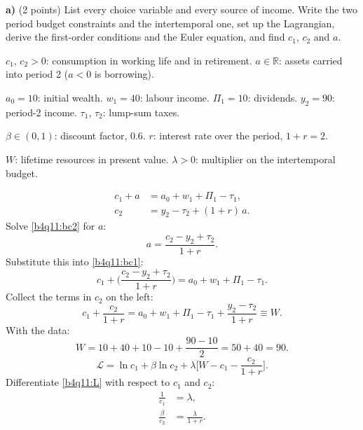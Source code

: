 \textbf{a)} (2 points) List every choice variable and every source of income. Write the two period budget constraints and the
intertemporal one, set up the Lagrangian, derive the first-order conditions and the Euler equation, and find $c_1$, $c_2$ and $a$.
\resolespaco
\begin{sol}
\begin{notacao}
\item $c_1$, $c_2>0$: consumption in working life and in retirement. $a\in\mathbb R$: assets carried into period 2 ($a<0$ is borrowing).
\item $a_0=10$: initial wealth. $w_1=40$: labour income. $\Pi_1=10$: dividends. $y_2=90$: period-2 income. $\tau_1$, $\tau_2$: lump-sum taxes.
\item $\beta\in(0,1)$: discount factor, $0.6$. $r$: interest rate over the period, $1+r=2$.
\item $W$: lifetime resources in present value. $\lambda>0$: multiplier on the intertemporal budget.
\end{notacao}
\begin{align}
c_1+a&=a_0+w_1+\Pi_1-\tau_1, \label{b4q11:bc1}\\
c_2&=y_2-\tau_2+(1+r)\,a. \label{b4q11:bc2}
\end{align}
Solve \eqref{b4q11:bc2} for $a$:
\[
a=\frac{c_2-y_2+\tau_2}{1+r}.
\]
Substitute this into \eqref{b4q11:bc1}:
\[
c_1+\Big(\frac{c_2-y_2+\tau_2}{1+r}\Big)=a_0+w_1+\Pi_1-\tau_1 .
\]
Collect the terms in $c_2$ on the left:
\begin{equation}
c_1+\frac{c_2}{1+r}=a_0+w_1+\Pi_1-\tau_1+\frac{y_2-\tau_2}{1+r}\equiv W. \label{b4q11:ibc}
\end{equation}
With the data:
\[
W=10+40+10-10+\frac{90-10}{2}=50+40=90 .
\]
\begin{equation}
\mathcal L=\ln c_1+\beta\ln c_2+\lambda\Big[W-c_1-\frac{c_2}{1+r}\Big]. \label{b4q11:L}
\end{equation}
Differentiate \eqref{b4q11:L} with respect to $c_1$ and $c_2$:
\begin{align}
\frac1{c_1}&=\lambda, \label{b4q11:foc1}\\
\frac{\beta}{c_2}&=\frac{\lambda}{1+r}. \label{b4q11:foc2}

\end{align}
\end{sol}
